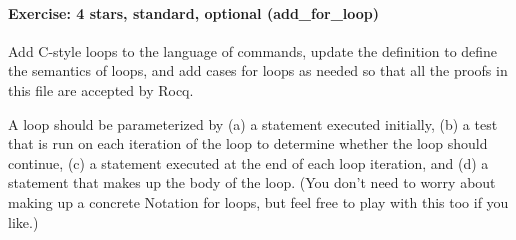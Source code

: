 \documentclass[12pt]{report}
\begin{document}
\paragraph{Exercise: 4 stars, standard, optional (add\_for\_loop)}




    Add C-style  loops to the language of commands, update the
     definition to define the semantics of  loops, and add
    cases for  loops as needed so that all the proofs in this
    file are accepted by Rocq.


    A  loop should be parameterized by (a) a statement executed
    initially, (b) a test that is run on each iteration of the loop to
    determine whether the loop should continue, (c) a statement
    executed at the end of each loop iteration, and (d) a statement
    that makes up the body of the loop.  (You don't need to worry
    about making up a concrete Notation for  loops, but feel free
    to play with this too if you like.) 
\begin{coqdoccode}
\coqdocemptyline
\coqdocemptyline
\end{coqdoccode}
\end{document}
